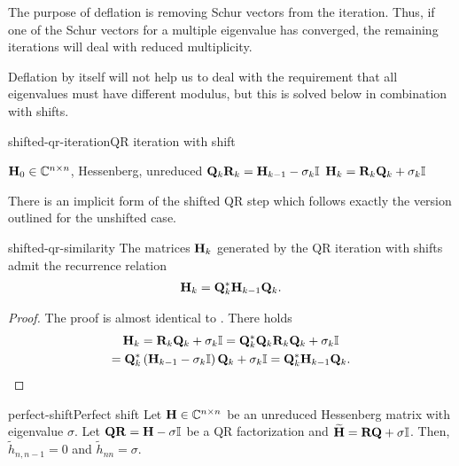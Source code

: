 \begin{remark}
  The purpose of deflation is removing Schur vectors from the
  iteration. Thus, if one of the Schur vectors for a multiple
  eigenvalue has converged, the remaining iterations will deal with
  reduced multiplicity.

  Deflation by itself will not help us to deal with the
  requirement that all eigenvalues must have different modulus, but
  this is solved below in combination with shifts.
\end{remark}

\begin{Algorithm*}{shifted-qr-iteration}{QR iteration with shift}
  \begin{algorithmic}[1]
    \Require $\mathbf H_0 \in\mathbb C^{n\times n}$, Hessenberg, unreduced
    \State $\mathbf Q_k\mathbf R_k = \mathbf H_{k-1} - \sigma_k\mathbb I$
    \State $\mathbf H_{k} = \mathbf R_k\mathbf Q_k + \sigma_k\mathbb I$
    \EndFor
  \end{algorithmic}
  There is an implicit form of the shifted QR step which follows
  exactly the version outlined for the unshifted case.
\end{Algorithm*}

\begin{Lemma}{shifted-qr-similarity}
  The matrices $\mathbf H_k$ generated by the QR iteration with shifts
  admit the recurrence relation
  \begin{gather}
    \mathbf H_k = \mathbf Q_k^*\mathbf H_{k-1}\mathbf Q_k.
  \end{gather}
\end{Lemma}  

\begin{proof}
  The proof is almost identical to . There holds
  \begin{multline}
    \mathbf H_k = \mathbf R_k\mathbf Q_k + \sigma_k \mathbb I
    = \mathbf Q_k^*\mathbf Q_k\mathbf R_k\mathbf Q_k + \sigma_k \mathbb I\\
    =\mathbf Q_k^*\left(\mathbf H_{k-1}-\sigma_k\mathbb I\right)\mathbf Q_k + \sigma_k \mathbb I
    =\mathbf Q_k^*\mathbf H_{k-1}\mathbf Q_k.
  \end{multline}
\end{proof}

\begin{Lemma*}{perfect-shift}{Perfect shift}
  Let $\mathbf H\in\mathbb C^{n\times n}$ be an unreduced Hessenberg matrix with eigenvalue
  $\sigma$. Let $\mathbf Q\mathbf R = \mathbf H - \sigma\mathbb I$ be a QR factorization
  and $\widetilde{\mathbf H} = \mathbf R\mathbf Q+\sigma\mathbb I$. Then,
  $\tilde h_{n,n-1}=0$ and $\tilde h_{nn} =\sigma$.
\end{Lemma*}

